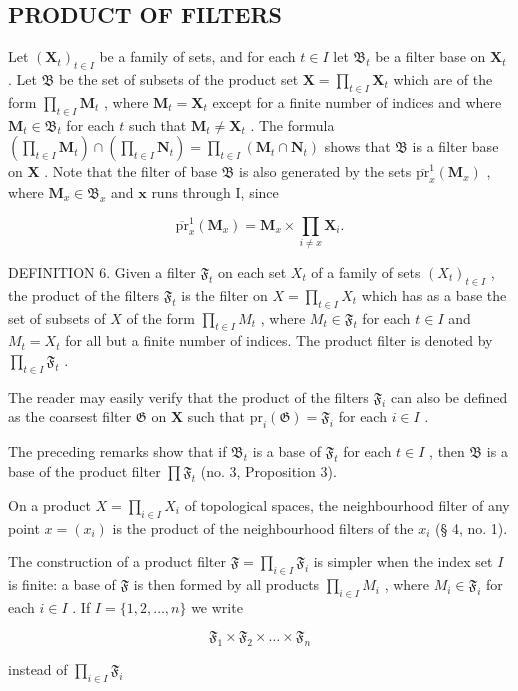 \subsection{PRODUCT OF FILTERS}

Let \((\mathbf{X}_t)_{t \in I}\) be a family of sets, and for each \(t \in I\) let \(\mathfrak{B}_t\) be a filter base on \(\mathbf{X}_t\) . Let \(\mathfrak{B}\) be the set of subsets of the product set \(\mathbf{X} = \prod_{t \in I} \mathbf{X}_t\) which are of the form \(\prod_{t \in I} \mathbf{M}_t\) , where \(\mathbf{M}_t = \mathbf{X}_t\) except for a finite number of indices and where \(\mathbf{M}_t \in \mathfrak{B}_t\) for each \(t\) such that \(\mathbf{M}_t \neq \mathbf{X}_t\) . The formula \(\left(\prod_{t \in I} \mathbf{M}_t\right) \cap \left(\prod_{t \in I} \mathbf{N}_t\right) = \prod_{t \in I} (\mathbf{M}_t \cap \mathbf{N}_t)\) shows that \(\mathfrak{B}\) is a filter base on \(\mathbf{X}\) . Note that the filter of base \(\mathfrak{B}\) is also generated by the sets \(\overline{\mathrm{pr}}_x^1 (\mathbf{M}_x)\) , where \(\mathbf{M}_x\in \mathfrak{B}_x\) and \(\pmb{x}\) runs through I, since

\[
\overline {{\mathrm{pr}}} _ {x} ^ {1} \left(\mathbf {M} _ {x}\right) = \mathbf {M} _ {x} \times \prod_ {i \neq x} \mathbf {X} _ {i}.
\]

DEFINITION 6. Given a filter \(\mathfrak{F}_t\) on each set \(X_t\) of a family of sets \((X_t)_{t \in I}\) , the product of the filters \(\mathfrak{F}_t\) is the filter on \(X = \prod_{t \in I} X_t\) which has as a base the set of subsets of \(X\) of the form \(\prod_{t \in I} M_t\) , where \(M_t \in \mathfrak{F}_t\) for each \(t \in I\) and \(M_t = X_t\) for all but a finite number of indices. The product filter is denoted by \(\prod_{t \in I} \mathfrak{F}_t\) .

The reader may easily verify that the product of the filters \(\mathfrak{F}_i\) can also be defined as the coarsest filter \(\mathfrak{G}\) on \(\mathbf{X}\) such that \(\mathrm{pr}_i(\mathfrak{G}) = \mathfrak{F}_i\) for each \(i \in I\) .

The preceding remarks show that if \(\mathfrak{B}_{t}\) is a base of \(\mathfrak{F}_{t}\) for each \(t\in I\) , then \(\mathfrak{B}\) is a base of the product filter \(\prod \mathfrak{F}_{t}\) (no. 3, Proposition 3).

On a product \(X = \prod_{i \in I} X_i\) of topological spaces, the neighbourhood filter of any point \(x = (x_i)\) is the product of the neighbourhood filters of the \(x_i\) (§ 4, no. 1).

The construction of a product filter \(\mathfrak{F} = \prod_{i\in I}\mathfrak{F}_i\) is simpler when the index set \(I\) is finite: a base of \(\mathfrak{F}\) is then formed by all products \(\prod_{i\in I}M_i\) , where \(M_i\in \mathfrak{F}_i\) for each \(i\in I\) . If \(I = \{1,2,\ldots,n\}\) we write

\[
\mathfrak {F} _ {1} \times \mathfrak {F} _ {2} \times \dots \times \mathfrak {F} _ {n}
\]

instead of \(\prod_{i\in I}\mathfrak{F}_i\)

